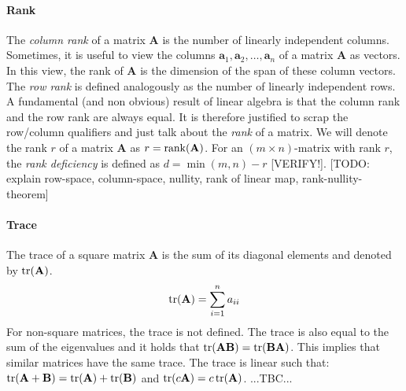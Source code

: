 \paragraph{Rank}
The \emph{column rank} of a matrix $\mathbf{A}$ is the number of linearly independent columns. Sometimes, it is useful to view the columns $\mathbf{a}_1, \mathbf{a}_2, \ldots, \mathbf{a}_n$ of a matrix $\mathbf{A}$ as vectors. In this view, the rank of $\mathbf{A}$ is the dimension of the span of these column vectors. The \emph{row rank} is defined analogously as the number of linearly independent rows. A fundamental (and non obvious) result of linear algebra is that the column rank and the row rank are always equal. It is therefore justified to scrap the row/column qualifiers and just talk about the \emph{rank} of a matrix. We will denote the rank $r$ of a matrix $\mathbf{A}$ as $r = \operatorname{rank}(\mathbf{A})$. For an $(m \times n)$-matrix with rank $r$, the \emph{rank deficiency} is defined as $d = \min(m,n) - r$ [VERIFY!]. [TODO: explain row-space, column-space, nullity, rank of linear map, rank-nullity-theorem]


\paragraph{Trace}
The trace of a square matrix $\mathbf{A}$ is the sum of its diagonal elements and denoted by $\operatorname{tr}(\mathbf{A})$. 
\begin{equation}
 \operatorname{tr}(\mathbf{A}) = \sum_{i=1}^{n} a_{ii}
\end{equation}
For non-square matrices, the trace is not defined. The trace is also equal to the sum of the eigenvalues and it holds that $\operatorname{tr}(\mathbf{A B}) = \operatorname{tr}(\mathbf{B A})$. This implies that similar matrices have the same trace. The trace is linear such that: $\operatorname{tr}(\mathbf{A + B}) = \operatorname{tr}(\mathbf{A}) + \operatorname{tr}(\mathbf{B})$ and $\operatorname{tr}(c \mathbf{A}) = c \operatorname{tr}(\mathbf{A})$. ...TBC...


